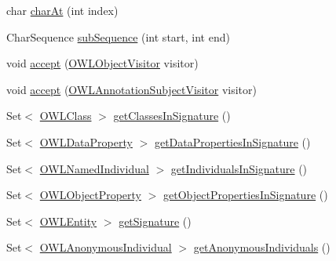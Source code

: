 \begin{DoxyCompactItemize}
char \hyperlink{classorg_1_1semanticweb_1_1owlapi_1_1model_1_1_i_r_i_aed58af4d93750dd31e0dada01be1b71b}{char\-At} (int index)
\item 
Char\-Sequence \hyperlink{classorg_1_1semanticweb_1_1owlapi_1_1model_1_1_i_r_i_ad7bdf7576fa1802a2ca1bfd917efb7a4}{sub\-Sequence} (int start, int end)
\item 
void \hyperlink{classorg_1_1semanticweb_1_1owlapi_1_1model_1_1_i_r_i_a0959a8004b62245c94a72e03bb2e49e1}{accept} (\hyperlink{interfaceorg_1_1semanticweb_1_1owlapi_1_1model_1_1_o_w_l_object_visitor}{O\-W\-L\-Object\-Visitor} visitor)
\item 
void \hyperlink{classorg_1_1semanticweb_1_1owlapi_1_1model_1_1_i_r_i_a50c35c2cb67e05c1e5b959af2585dddd}{accept} (\hyperlink{interfaceorg_1_1semanticweb_1_1owlapi_1_1model_1_1_o_w_l_annotation_subject_visitor}{O\-W\-L\-Annotation\-Subject\-Visitor} visitor)
\item 
Set$<$ \hyperlink{interfaceorg_1_1semanticweb_1_1owlapi_1_1model_1_1_o_w_l_class}{O\-W\-L\-Class} $>$ \hyperlink{classorg_1_1semanticweb_1_1owlapi_1_1model_1_1_i_r_i_a796b557f9337f41c2ca32ac26f0d6c4f}{get\-Classes\-In\-Signature} ()
\item 
Set$<$ \hyperlink{interfaceorg_1_1semanticweb_1_1owlapi_1_1model_1_1_o_w_l_data_property}{O\-W\-L\-Data\-Property} $>$ \hyperlink{classorg_1_1semanticweb_1_1owlapi_1_1model_1_1_i_r_i_aa94560b9ed75a428fc317dd246849b2d}{get\-Data\-Properties\-In\-Signature} ()
\item 
Set$<$ \hyperlink{interfaceorg_1_1semanticweb_1_1owlapi_1_1model_1_1_o_w_l_named_individual}{O\-W\-L\-Named\-Individual} $>$ \hyperlink{classorg_1_1semanticweb_1_1owlapi_1_1model_1_1_i_r_i_a2dea9fabd433bdddf863f690922e45cf}{get\-Individuals\-In\-Signature} ()
\item 
Set$<$ \hyperlink{interfaceorg_1_1semanticweb_1_1owlapi_1_1model_1_1_o_w_l_object_property}{O\-W\-L\-Object\-Property} $>$ \hyperlink{classorg_1_1semanticweb_1_1owlapi_1_1model_1_1_i_r_i_ab81988d1a409e4c4c786bf838bec61bc}{get\-Object\-Properties\-In\-Signature} ()
\item 
Set$<$ \hyperlink{interfaceorg_1_1semanticweb_1_1owlapi_1_1model_1_1_o_w_l_entity}{O\-W\-L\-Entity} $>$ \hyperlink{classorg_1_1semanticweb_1_1owlapi_1_1model_1_1_i_r_i_a97806e467662f26392b049cfe8f70e68}{get\-Signature} ()
\item 
Set$<$ \hyperlink{interfaceorg_1_1semanticweb_1_1owlapi_1_1model_1_1_o_w_l_anonymous_individual}{O\-W\-L\-Anonymous\-Individual} $>$ \hyperlink{classorg_1_1semanticweb_1_1owlapi_1_1model_1_1_i_r_i_a9921fc1089976534e0e6b4a861c4a2fa}{get\-Anonymous\-Individuals} ()

\end{DoxyCompactItemize}
